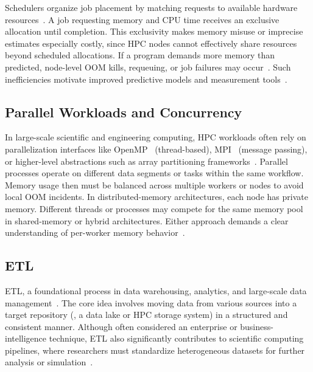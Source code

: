 Schedulers organize job placement by matching requests to available hardware resources~\cite{yoo2003slurm}.
A job requesting memory and \ac{CPU} time receives an exclusive allocation until completion.
This exclusivity makes memory misuse or imprecise estimates especially costly, since \ac{HPC} nodes cannot effectively share resources beyond scheduled allocations.
If a program demands more memory than predicted, node-level \ac{OOM} kills, requeuing, or job failures may occur~\cite{Bader2023}.
Such inefficiencies motivate improved predictive models and measurement tools~\cite{Bader2024}.

\subsection{Parallel Workloads and Concurrency}
\label{subsec:fundamentals-parallel-concurrency}

In large-scale scientific and engineering computing, \ac{HPC} workloads often rely on parallelization interfaces like \ac{OpenMP}~\cite{Dagum1998OpenMP} (thread-based), \ac{MPI}~\cite{Snir1998MPI} (message passing), or higher-level abstractions such as array partitioning frameworks~\cite{rocklin2015dask}.
Parallel processes operate on different data segments or tasks within the same workflow.
Memory usage then must be balanced across multiple workers or nodes to avoid local \ac{OOM} incidents.
In distributed-memory architectures, each node has private memory.
Different threads or processes may compete for the same memory pool in shared-memory or hybrid architectures.
Either approach demands a clear understanding of per-worker memory behavior~\cite{Bader2023}.

\subsection{\ac{ETL}}
\label{subsec:fundamentals-etl}

\ac{ETL}, a foundational process in data warehousing, analytics, and large-scale data management~\cite{Vassiliadis2009ETL}.
The core idea involves moving data from various sources into a target repository (\eg{}, a data lake or \ac{HPC} storage system) in a structured and consistent manner.
Although often considered an enterprise or business-intelligence technique, \ac{ETL} also significantly contributes to scientific computing pipelines, where researchers must standardize heterogeneous datasets for further analysis or simulation~\cite{Vassiliadis2009ETL}.

